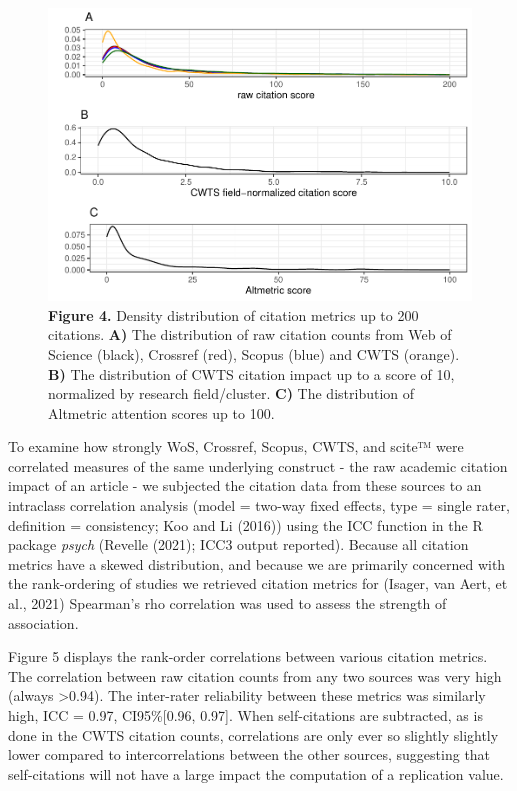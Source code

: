 \documentclass[
  man,floatsintext]{apa6}
\begin{document}
~

\begin{figure}
\centering
\includegraphics{RVcn_feasibility_in_social_neuroscience_cortex_files/figure-latex/fig4-1.pdf}
\caption{\label{fig:fig4}\textbf{Figure 4.} Density distribution of citation metrics up to 200 citations. \textbf{A)} The distribution of raw citation counts from Web of Science (black), Crossref (red), Scopus (blue) and CWTS (orange). \textbf{B)} The distribution of CWTS citation impact up to a score of 10, normalized by research field/cluster. \textbf{C)} The distribution of Altmetric attention scores up to 100.}
\end{figure}

To examine how strongly WoS, Crossref, Scopus, CWTS, and scite™ were correlated measures of the same underlying construct - the raw academic citation impact of an article - we subjected the citation data from these sources to an intraclass correlation analysis (model = two-way fixed effects, type = single rater, definition = consistency; Koo and Li (2016)) using the ICC function in the R package \emph{psych} (Revelle (2021); ICC3 output reported). Because all citation metrics have a skewed distribution, and because we are primarily concerned with the rank-ordering of studies we retrieved citation metrics for (Isager, van Aert, et al., 2021) Spearman's rho correlation was used to assess the strength of association.

Figure 5 displays the rank-order correlations between various citation metrics. The correlation between raw citation counts from any two sources was very high (always \textgreater0.94). The inter-rater reliability between these metrics was similarly high, ICC = 0.97, CI95\%{[}0.96, 0.97{]}. When self-citations are subtracted, as is done in the CWTS citation counts, correlations are only ever so slightly slightly lower compared to intercorrelations between the other sources, suggesting that self-citations will not have a large impact the computation of a replication value.
\end{document}
